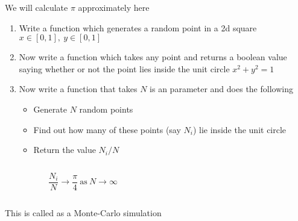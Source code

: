 \begin{frame}[fragile]
    \begin{exercise}
        We will calculate $\pi$ approximately here
        \begin{enumerate}
            \item Write a function  which generates a random point in a 2d square $x \in [0,1],\ y \in [0,1]$\\
            \item<2-> Now write a function  which takes any point and returns a boolean value saying whether or not the point lies inside the unit circle $x^2+y^2=1$
            \item<3-> Now write a function  that takes $N$ is an parameter and does the following
            \begin{itemize}
                \item Generate $N$ random points
                \item Find out how many of these points (say $N_i$) lie inside the unit circle
                \item Return the value $N_i/N$
            \end{itemize}
        \end{enumerate}
        \begin{columns}
            \begin{column}{0.5\linewidth}
                \begin{equation*}
                    \frac{N_i}{N} \to \frac{\pi}{4}\ \text{as}\ N \to \infty
                \end{equation*}
            \end{column}
            \begin{column}{0.5\linewidth}
                \begin{figure}
                    \centering
                \end{figure}
            \end{column}
        \end{columns}
        This is called as a Monte-Carlo simulation
    \end{exercise}
\end{frame}

